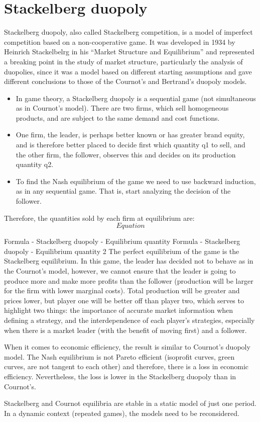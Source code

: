 \documentclass[]{report}
\begin{document}
\section{Stackelberg duopoly}
Stackelberg duopoly, also called Stackelberg competition, is a model of imperfect competition based on a non-cooperative game. It was developed in 1934 by Heinrich Stackelbelrg in his “Market Structure and Equilibrium” and represented a breaking point in the study of market structure, particularly the analysis of duopolies, since it was a model based on different starting assumptions and gave different conclusions to those of the Cournot’s and Bertrand’s duopoly models.

\begin{itemize}
\item In game theory, a Stackelberg duopoly is a sequential game (not simultaneous as in Cournot’s model). There are two firms, which sell homogeneous products, and are subject to the same demand and cost functions. 
\item One firm, the leader, is perhaps better known or has greater brand equity, and is therefore better placed to decide first which quantity q1 to sell, and the other firm, the follower, observes this and decides on its production quantity q2. 
\item To find the Nash equilibrium of the game we need to use backward induction, as in any sequential game. That is, start analyzing the decision of the follower.
\end{itemize}


Therefore, the quantities sold by each firm at equilibrium are:
\[ Equation \]

Formula - Stackelberg duopoly - Equilibrium quantity	Formula - Stackelberg duopoly - Equilibrium quantity 2
The perfect equilibrium of the game is the Stackelberg equilibrium. In this game, the leader has decided not to behave as in the Cournot’s model, however, we cannot ensure that the leader is going to produce more and make more profits than the follower (production will be larger for the firm with lower marginal costs). Total production will be greater and prices lower, but player one will be better off than player two, which serves to highlight two things: the importance of accurate market information when defining a strategy, and the interdependence of each player’s strategies, especially when there is a market leader (with the benefit of moving first) and a follower.

When it comes to economic efficiency, the result is similar to Cournot’s duopoly model. The Nash equilibrium is not Pareto efficient (isoprofit curves, green curves, are not tangent to each other) and therefore, there is a loss in economic efficiency. Nevertheless, the loss is lower in the Stackelberg duopoly than in Cournot’s.

Stackelberg and Cournot equilibria are stable in a static model of just one period. In a dynamic context (repeated games), the models need to be reconsidered.
\end{document}
